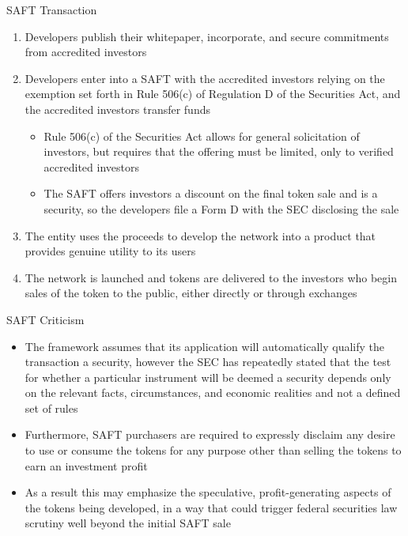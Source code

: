\documentclass[10pt]{beamer}
\begin{document}

\begin{frame}{SAFT Transaction}
	\begin{enumerate}
		\item Developers publish their whitepaper, incorporate, and secure commitments from accredited investors
		\item Developers enter into a SAFT with the accredited investors relying on the exemption set forth in Rule 506(c) of Regulation D of the Securities Act, and the accredited investors transfer funds
		\begin{itemize}
			\item Rule 506(c) of the Securities Act allows for general solicitation of investors, but requires that the offering must be limited, only to verified accredited investors
			\item The SAFT offers investors a discount on the final token sale and is a security, so the developers file a Form D with the SEC disclosing the sale
		\end{itemize}
		\item The entity uses the proceeds to develop the network into a product that provides genuine utility to its users
		\item The network is launched and tokens are delivered to the investors who begin sales of the token to the public, either directly or through exchanges
	\end{enumerate}
\end{frame}


\begin{frame}{SAFT Criticism}
	\begin{itemize}
		\item The framework assumes that its application will automatically qualify the transaction a security, however the SEC has repeatedly stated that the test for whether a particular instrument will be deemed a security depends only on the relevant facts, circumstances, and economic realities and not a defined set of rules
		\item Furthermore, SAFT purchasers are required to expressly disclaim any desire to use or consume the tokens for any purpose other than selling the tokens to earn an investment profit
		\item As a result this may emphasize the speculative, profit-generating aspects of the tokens being developed, in a way that could trigger federal securities law scrutiny well beyond the initial SAFT sale
	\end{itemize}
\end{frame}
\end{document}
